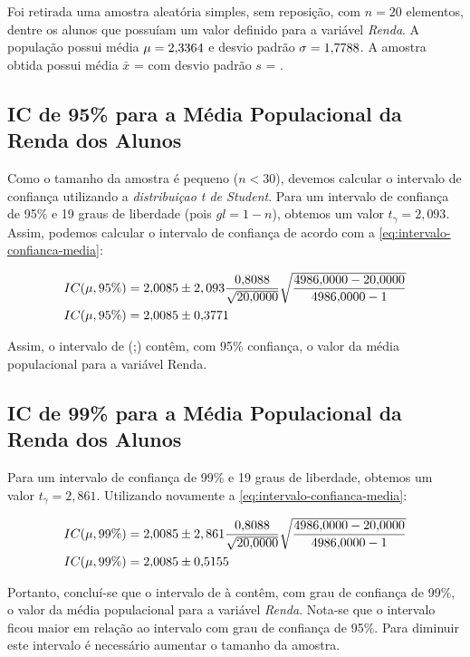 

	Foi retirada uma amostra aleatória simples, sem reposição, com $n = 20$
	elementos, dentre os \TRESN alunos que possuíam um valor definido para a
	variável \textit{Renda}.
	A população possui média $\mu = \num{2.3364}$ e desvio padrão $\sigma = \num{1.7788}$.
	A amostra obtida possui média $\bar{x}$ = \TRESx com desvio padrão $s$ = \TRESsd.

\subsection{IC de 95\% para a Média Populacional da Renda dos Alunos}

	Como o tamanho da amostra é pequeno ($n < 30$), devemos calcular o intervalo
	de confiança utilizando a \textit{distribuiçao t de Student}. Para um
	intervalo de confiança de 95\% e 19 graus de liberdade (pois $gl = 1-n$),
	obtemos um valor $t_{\gamma} = 2,093$.  Assim, podemos calcular o intervalo de
	confiança de acordo com a \autoref{eq:intervalo-confianca-media}:

	\begin{align*}
		IC (\mu, 95\%) &= \num{2.0085} \pm 2,093 \frac{\num{0.8088}}{\sqrt{\num{20}}} \sqrt{\frac{\num{4986} - \num{20}}{\num{4986} - 1}} \\
		IC (\mu, 95\%) &= \num{2.0085} \pm \num{0.3771}
	\end{align*}

	Assim, o intervalo de (\TRESicmin;\TRESicmax) contêm, com 95\% confiança, o
	valor da média populacional para a variável Renda.

\subsection{IC de 99\% para a Média Populacional da Renda dos Alunos}

	Para um intervalo de confiança de 99\% e 19 graus de liberdade, obtemos
	um valor $t_{\gamma} = 2,861$.  Utilizando novamente a \autoref{eq:intervalo-confianca-media}:

	\begin{align*}
		IC (\mu, 99\%) &= \num{2.0085} \pm 2,861 \frac{\num{0.8088}}{\sqrt{\num{20}}} \sqrt{\frac{\num{4986} - \num{20}}{\num{4986} - 1}} \\
		IC (\mu, 99\%) &= \num{2.0085} \pm \num{0.5155}
	\end{align*}

	Portanto, concluí-se que o intervalo de \TRESicNoveNoveMin à \TRESicNoveNoveMax contêm,
	com grau de confiança de 99\%, o valor da média populacional para a
	variável \textit{Renda}. Nota-se que o intervalo ficou maior em relação ao
	intervalo com grau de confiança de 95\%.  Para diminuir este intervalo é
	necessário aumentar o tamanho da amostra.

